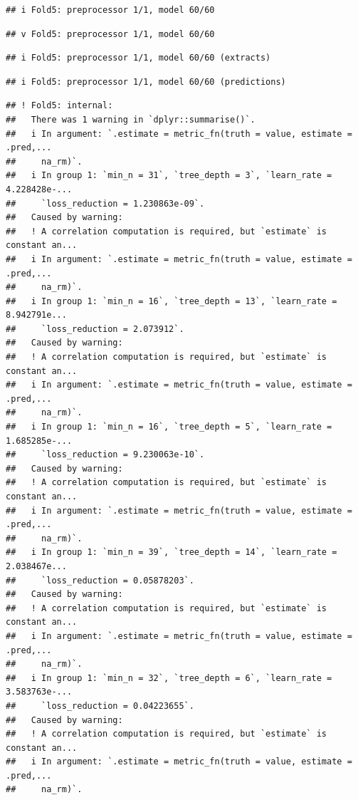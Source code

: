 \documentclass[
]{article}
\begin{document}
\begin{verbatim}
## i Fold5: preprocessor 1/1, model 60/60
\end{verbatim}

\begin{verbatim}
## v Fold5: preprocessor 1/1, model 60/60
\end{verbatim}

\begin{verbatim}
## i Fold5: preprocessor 1/1, model 60/60 (extracts)
\end{verbatim}

\begin{verbatim}
## i Fold5: preprocessor 1/1, model 60/60 (predictions)
\end{verbatim}

\begin{verbatim}
## ! Fold5: internal:
##   There was 1 warning in `dplyr::summarise()`.
##   i In argument: `.estimate = metric_fn(truth = value, estimate = .pred,...
##     na_rm)`.
##   i In group 1: `min_n = 31`, `tree_depth = 3`, `learn_rate = 4.228428e-...
##     `loss_reduction = 1.230863e-09`.
##   Caused by warning:
##   ! A correlation computation is required, but `estimate` is constant an...
##   i In argument: `.estimate = metric_fn(truth = value, estimate = .pred,...
##     na_rm)`.
##   i In group 1: `min_n = 16`, `tree_depth = 13`, `learn_rate = 8.942791e...
##     `loss_reduction = 2.073912`.
##   Caused by warning:
##   ! A correlation computation is required, but `estimate` is constant an...
##   i In argument: `.estimate = metric_fn(truth = value, estimate = .pred,...
##     na_rm)`.
##   i In group 1: `min_n = 16`, `tree_depth = 5`, `learn_rate = 1.685285e-...
##     `loss_reduction = 9.230063e-10`.
##   Caused by warning:
##   ! A correlation computation is required, but `estimate` is constant an...
##   i In argument: `.estimate = metric_fn(truth = value, estimate = .pred,...
##     na_rm)`.
##   i In group 1: `min_n = 39`, `tree_depth = 14`, `learn_rate = 2.038467e...
##     `loss_reduction = 0.05878203`.
##   Caused by warning:
##   ! A correlation computation is required, but `estimate` is constant an...
##   i In argument: `.estimate = metric_fn(truth = value, estimate = .pred,...
##     na_rm)`.
##   i In group 1: `min_n = 32`, `tree_depth = 6`, `learn_rate = 3.583763e-...
##     `loss_reduction = 0.04223655`.
##   Caused by warning:
##   ! A correlation computation is required, but `estimate` is constant an...
##   i In argument: `.estimate = metric_fn(truth = value, estimate = .pred,...
##     na_rm)`.

\end{verbatim}
\end{document}
